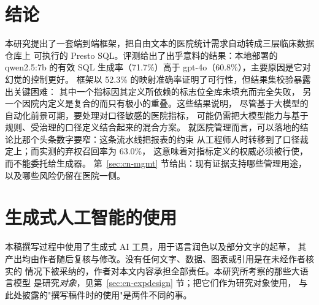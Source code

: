 \documentclass[11pt,a4paper]{article}
\begin{document}
\section{结论}
本研究提出了一套端到端框架，把自由文本的医院统计需求自动转成三层临床数据仓库上
可执行的 Presto SQL。评测给出了出乎意料的结果：本地部署的 qwen2.5:7b 的有效 SQL
生成率（71.7\%）高于 gpt-4o（60.8\%），主要原因是它对幻觉的控制更好。
框架以 52.3\% 的映射准确率证明了可行性，但结果集校验暴露出关键困难：
其中一个指标因其定义所依赖的标志位全库未填充而完全失败，
另一个因院内定义是复合的而只有极小的重叠。这些结果说明，
尽管基于大模型的自动化前景可期，要处理对口径敏感的医院指标，
可能仍需把大模型能力与基于规则、受治理的口径定义结合起来的混合方案。
就医院管理而言，可以落地的结论比那个头条数字要窄：这条流水线把报表的约束
从工程师人时转移到了口径裁定上；而实测的弃权召回率为 63.0\%，
这意味着对指标定义的权威必须被行使，而不能委托给生成器。
第~\ref{sec:cn-mgmt} 节给出：现有证据支持哪些管理用途，
以及哪些风险仍留在医院一侧。

\section*{生成式人工智能的使用}
本稿撰写过程中使用了生成式 AI 工具，用于语言润色以及部分文字的起草，
其产出均由作者随后复核与修改。没有任何文字、数据、图表或引用是在未经作者核实的
情况下被采纳的，作者对本文内容承担全部责任。本研究所考察的那些大语言模型
是研究\emph{对象}，见第~\ref{sec:cn-expdesign} 节；把它们作为研究对象使用，
与此处披露的"撰写稿件时的使用"是两件不同的事。

\vspace{6pt}
\end{document}
